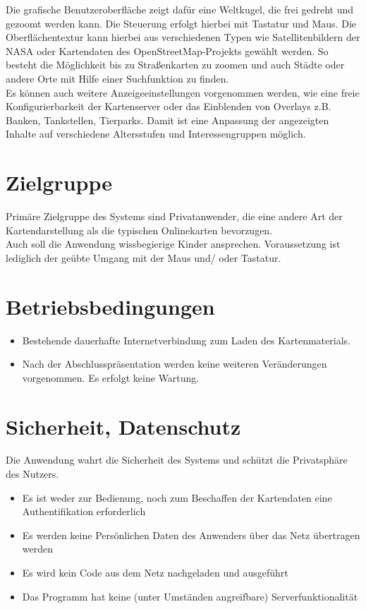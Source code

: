 \documentclass[10pt]{scrreprt}
\begin{document}
Die grafische Benutzeroberfläche zeigt dafür eine Weltkugel, die frei gedreht und gezoomt werden kann. Die Steuerung erfolgt hierbei mit Tastatur und Maus. Die Oberflächentextur kann hierbei aus verschiedenen Typen wie Satellitenbildern der NASA oder Kartendaten des OpenStreetMap-Projekts gewählt werden. 
So besteht die Möglichkeit bis zu Straßenkarten zu zoomen und auch Städte oder andere Orte mit Hilfe einer Suchfunktion zu finden. \\

Es können auch weitere Anzeigeeinstellungen vorgenommen werden, wie eine freie Konfigurierbarkeit der Kartenserver oder das Einblenden von Overlays z.B. Banken, Tankstellen, Tierparks.  
Damit ist eine Anpassung der angezeigten Inhalte auf verschiedene Altersstufen und Interessengruppen möglich.


\section{Zielgruppe}
Primäre Zielgruppe des Systems sind Privatanwender, die eine andere Art der Kartendarstellung als die typischen Onlinekarten bevorzugen. \\

Auch soll die Anwendung wissbegierige Kinder ansprechen. Voraussetzung ist lediglich der geübte Umgang mit der Maus und/ oder Tastatur.

\section{Betriebsbedingungen}
\begin{itemize}
\item Bestehende dauerhafte Internetverbindung zum Laden des Kartenmaterials.
\item Nach der Abschlusspräsentation werden keine weiteren 
Veränderungen vorgenommen. Es erfolgt keine Wartung.
\end{itemize} 

\section{Sicherheit, Datenschutz}
Die Anwendung wahrt die Sicherheit des Systems und schützt die Privatsphäre des Nutzers.
\begin{itemize}
\item Es ist weder zur Bedienung, noch zum Beschaffen der Kartendaten eine Authentifikation erforderlich 
\item Es werden keine Persönlichen Daten des Anwenders über das Netz übertragen werden
\item Es wird kein Code aus dem Netz nachgeladen und ausgeführt
\item Das Programm hat keine (unter Umständen angreifbare) Serverfunktionalität
\end{itemize}
\end{document}
